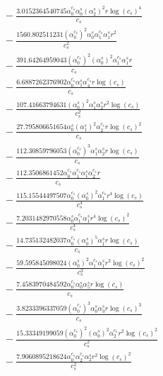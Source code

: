 \documentclass[10pt]{article}
\begin{document}
\begin{align*}
&{}  - \frac{3.0152364540745 \alpha_{0}^{c_s} \alpha_{0}^s \left(\alpha_{2}^s\right)^{2} r \log{\left(c_{s} \right)}^{4}}{c_{s}} \\
&{}  - \frac{1560.802511231 \left(\alpha_{0}^{c_s}\right)^{2} \alpha_{0}^s \alpha_{1}^{c_s} \alpha_{1}^s r^{2}}{c_{s}^{2}} \\
&{}  - \frac{391.64264959043 \left(\alpha_{0}^{c_s}\right)^{2} \left(\alpha_{0}^s\right)^{2} \alpha_{1}^{c_s} \alpha_{1}^s r}{c_{s}} \\
&{}  - \frac{6.6887262376902 \alpha_{0}^{c_s} \alpha_{1}^s \alpha_{4}^{c_s} r \log{\left(c_{s} \right)}}{c_{s}} \\
&{}  - \frac{107.41663794631 \left(\alpha_{0}^s\right)^{2} \alpha_{1}^s \alpha_{2}^s r^{2} \log{\left(c_{s} \right)}}{c_{s}^{2}} \\
&{}  - \frac{27.795806651654 \alpha_{0}^s \left(\alpha_{1}^s\right)^{2} \alpha_{2}^{c_s} r \log{\left(c_{s} \right)}^{2}}{c_{s}} \\
&{}  - \frac{112.30859796053 \left(\alpha_{0}^{c_s}\right)^{3} \alpha_{1}^s \alpha_{2}^s r \log{\left(c_{s} \right)}}{c_{s}} \\
&{}  - \frac{112.3506861452 \alpha_{0}^{c_s} \alpha_{1}^{c_s} \alpha_{1}^s \alpha_{2}^{c_s} r}{c_{s}} \\
&{}  - \frac{115.15544497507 \alpha_{0}^{c_s} \left(\alpha_{0}^s\right)^{2} \alpha_{1}^{c_s} r^{4} \log{\left(c_{s} \right)}}{c_{s}^{4}} \\
&{}  - \frac{7.2031482970558 \alpha_{0}^s \alpha_{1}^{c_s} \alpha_{1}^s r^{4} \log{\left(c_{s} \right)}^{2}}{c_{s}^{4}} \\
&{}  - \frac{14.735132482037 \alpha_{0}^{c_s} \left(\alpha_{0}^s\right)^{5} \alpha_{1}^s r \log{\left(c_{s} \right)}}{c_{s}} \\
&{}  - \frac{59.595845098024 \left(\alpha_{0}^s\right)^{2} \alpha_{1}^{c_s} \alpha_{1}^s r^{3} \log{\left(c_{s} \right)}^{2}}{c_{s}^{3}} \\
&{}  - \frac{7.4583970484592 \alpha_{0}^{c_s} \alpha_{0}^s \alpha_{5}^s r \log{\left(c_{s} \right)}}{c_{s}} \\
&{}  - \frac{3.8233396337059 \left(\alpha_{0}^{c_s}\right)^{3} \alpha_{0}^s \alpha_{3}^s r \log{\left(c_{s} \right)}^{3}}{c_{s}} \\
&{}  - \frac{15.33349199059 \left(\alpha_{0}^{c_s}\right)^{2} \left(\alpha_{0}^s\right)^{2} \alpha_{2}^{c_s} r^{2} \log{\left(c_{s} \right)}^{2}}{c_{s}^{2}} \\
&{}  - \frac{7.9060895218624 \alpha_{0}^{c_s} \alpha_{2}^{c_s} \alpha_{2}^s r^{2} \log{\left(c_{s} \right)}^{2}}{c_{s}^{2}} \\

\end{align*}
\end{document}
